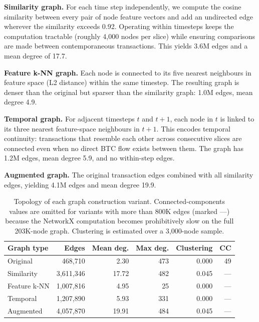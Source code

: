 \textbf{Similarity graph.} For each time step independently, we compute the
cosine similarity between every pair of node feature vectors and add an
undirected edge wherever the similarity exceeds 0.92. Operating within
timesteps keeps the computation tractable (roughly 4,000 nodes per slice)
while ensuring comparisons are made between contemporaneous transactions.
This yields 3.6M edges and a mean degree of 17.7.

\textbf{Feature k-NN graph.} Each node is connected to its five nearest
neighbours in feature space (L2 distance) within the same timestep. The
resulting graph is denser than the original but sparser than the similarity
graph: 1.0M edges, mean degree 4.9.

\textbf{Temporal graph.} For adjacent timesteps $t$ and $t{+}1$, each node
in $t$ is linked to its three nearest feature-space neighbours in $t{+}1$.
This encodes temporal continuity: transactions that resemble each other
across consecutive slices are connected even when no direct BTC flow exists
between them. The graph has 1.2M edges, mean degree 5.9, and no within-step
edges.

\textbf{Augmented graph.} The original transaction edges combined with all
similarity edges, yielding 4.1M edges and mean degree 19.9.

\begin{table}[!htbp]
\centering
\caption{Topology of each graph construction variant. Connected-components
  values are omitted for variants with more than 800K edges (marked ---)
  because the NetworkX computation becomes prohibitively slow on the
  full 203K-node graph. Clustering is estimated over a 3,000-node sample.}
\label{tab:graph_stats}
\small
\begin{tabular}{lrrrrr}
\toprule
\textbf{Graph type} & \textbf{Edges} & \textbf{Mean deg.}
  & \textbf{Max deg.} & \textbf{Clustering} & \textbf{CC} \\
\midrule
Original    &    468,710 &  2.30 & 473 & 0.000 & 49 \\
Similarity  &  3,611,346 & 17.72 & 482 & 0.045 & ---\\
Feature k-NN & 1,007,816 &  4.95 &  25 & 0.000 & ---\\
Temporal    &  1,207,890 &  5.93 & 331 & 0.000 & ---\\
Augmented   &  4,057,870 & 19.91 & 484 & 0.045 & ---\\
\bottomrule
\end{tabular}
\end{table}

